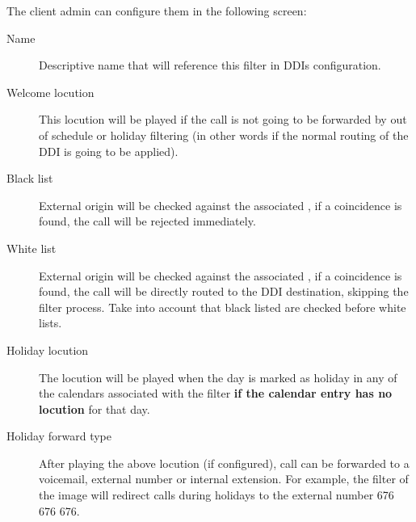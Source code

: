 \documentclass[letterpaper,10pt,spanish]{sphinxmanual}
\begin{document}
The client admin can configure them in the following screen:
\begin{description}
\item[{Name}] \leavevmode{}\label{administration_portal/client/vpbx/routing_tools/external_call_filters:term-name}
Descriptive name that will reference this filter in DDIs configuration.

\item[{Welcome locution}] \leavevmode{}\label{administration_portal/client/vpbx/routing_tools/external_call_filters:term-welcome-locution}
This locution will be played if the call is not going to be
forwarded by out of schedule or holiday filtering (in other words if
the normal routing of the DDI is going to be applied).

\item[{Black list}] \leavevmode{}\label{administration_portal/client/vpbx/routing_tools/external_call_filters:term-black-list}
External origin will be checked against the associated {\hyperref[administration_portal/client/vpbx/routing_tools/match_lists:match\string-lists]{}},
if a coincidence is found, the call will be rejected immediately.

\item[{White list}] \leavevmode{}\label{administration_portal/client/vpbx/routing_tools/external_call_filters:term-white-list}
External origin will be checked against the associated {\hyperref[administration_portal/client/vpbx/routing_tools/match_lists:match\string-lists]{}},
if a coincidence is found, the call will be directly routed to the DDI
destination, skipping the filter process. Take into account that black
listed are checked before white lists.

\item[{Holiday locution}] \leavevmode{}\label{administration_portal/client/vpbx/routing_tools/external_call_filters:term-holiday-locution}
The locution will be  played when the day is marked as holiday in any
of the calendars associated with the filter \textbf{if the calendar entry has
no locution} for that day.

\item[{Holiday forward type}] \leavevmode{}\label{administration_portal/client/vpbx/routing_tools/external_call_filters:term-holiday-forward-type}
After playing the above locution (if configured), call can be forwarded
to a voicemail, external number or internal extension. For example, the
filter of the image will redirect calls during holidays to the external
number 676 676 676.


\end{description}
\end{document}
